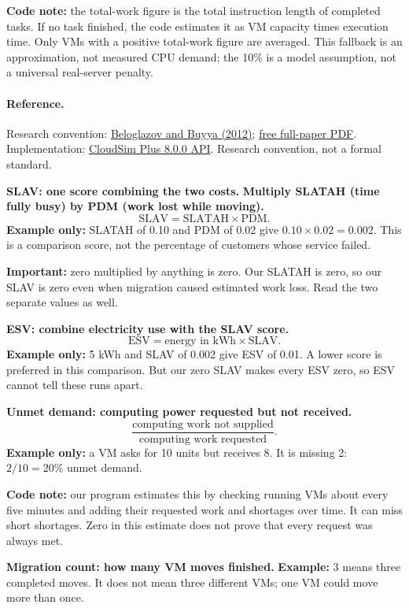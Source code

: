 \documentclass[11pt,a4paper]{article}
\begin{document}
\textbf{Code note:} the total-work figure is the total instruction length of completed tasks. If no task finished, the code estimates it as VM capacity times execution time. Only VMs with a positive total-work figure are averaged. This fallback is an approximation, not measured CPU demand; the 10\% is a model assumption, not a universal real-server penalty.
\paragraph{Reference.} Research convention: \href{https://doi.org/10.1002/cpe.1867}{Beloglazov and Buyya (2012)}; \href{https://beloglazov.info/papers/2012-optimal-algorithms-ccpe.pdf}{free full-paper PDF}. Implementation: \href{https://javadoc.io/doc/org.cloudsimplus/cloudsim-plus/8.0.0/index.html}{CloudSim Plus 8.0.0 API}. Research convention, not a formal standard.\par

\textbf{SLAV: one score combining the two costs.}
\textbf{Multiply SLATAH (time fully busy) by PDM (work lost while moving).}
\[\mathrm{SLAV}=\mathrm{SLATAH}\times\mathrm{PDM}.\]
\textbf{Example only:} SLATAH of 0.10 and PDM of 0.02 give $0.10\times0.02=0.002$. This is a comparison score, not the percentage of customers whose service failed.

\textbf{Important:} zero multiplied by anything is zero. Our SLATAH is zero, so our SLAV is zero even when migration caused estimated work loss. Read the two separate values as well.

\textbf{ESV: combine electricity use with the SLAV score.}
\[\mathrm{ESV}=\text{energy in kWh}\times\mathrm{SLAV}.\]
\textbf{Example only:} 5 kWh and SLAV of 0.002 give ESV of 0.01. A lower score is preferred in this comparison. But our zero SLAV makes every ESV zero, so ESV cannot tell these runs apart.

\textbf{Unmet demand: computing power requested but not received.}
\[\frac{\text{computing work not supplied}}{\text{computing work requested}}.\]
\textbf{Example only:} a VM asks for 10 units but receives 8. It is missing 2: $2/10=20\%$ unmet demand.

\textbf{Code note:} our program estimates this by checking running VMs about every five minutes and adding their requested work and shortages over time. It can miss short shortages. Zero in this estimate does not prove that every request was always met.

\textbf{Migration count: how many VM moves finished.}
\textbf{Example:} 3 means three completed moves. It does not mean three different VMs; one VM could move more than once.
\end{document}
